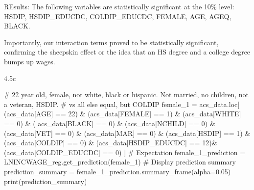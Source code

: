 \documentclass[
  11pt,
  letterpaper,
  DIV=11,
  numbers=noendperiod]{scrartcl}
\newenvironment{Shaded}{\begin{snugshade}}{\end{snugshade}}
\newcommand{\BuiltInTok}[1]{\textcolor[rgb]{0.00,0.23,0.31}{#1}}
\newcommand{\CommentTok}[1]{\textcolor[rgb]{0.37,0.37,0.37}{#1}}
\newcommand{\DecValTok}[1]{\textcolor[rgb]{0.68,0.00,0.00}{#1}}
\newcommand{\FloatTok}[1]{\textcolor[rgb]{0.68,0.00,0.00}{#1}}
\newcommand{\NormalTok}[1]{\textcolor[rgb]{0.00,0.23,0.31}{#1}}
\newcommand{\OperatorTok}[1]{\textcolor[rgb]{0.37,0.37,0.37}{#1}}
\newcommand{\StringTok}[1]{\textcolor[rgb]{0.13,0.47,0.30}{#1}}
\begin{document}
REsults: The following variables are statistically significant at the
10\% level: HSDIP, HSDIP\_EDUCDC, COLDIP\_EDUCDC, FEMALE, AGE, AGEQ,
BLACK.

Importantly, our interaction terms proved to be statistically
significant, confirming the sheepskin effect or the idea that an HS
degree and a college degree bumps up wages.

4.5c

\begin{Shaded}
\begin{Highlighting}[]
\CommentTok{\# 22 year old, female, not white, black or hispanic. Not married, no children, not a veteran, HSDIP.}
\CommentTok{\# vs all else equal, but COLDIP}
\NormalTok{female\_1 }\OperatorTok{=}\NormalTok{ acs\_data.loc[}
\NormalTok{    (acs\_data[}\StringTok{\textquotesingle{}AGE\textquotesingle{}}\NormalTok{] }\OperatorTok{==} \DecValTok{22}\NormalTok{) }\OperatorTok{\&}\NormalTok{ (acs\_data[}\StringTok{\textquotesingle{}FEMALE\textquotesingle{}}\NormalTok{] }\OperatorTok{==} \DecValTok{1}\NormalTok{) }\OperatorTok{\&}\NormalTok{ (acs\_data[}\StringTok{\textquotesingle{}WHITE\textquotesingle{}}\NormalTok{] }\OperatorTok{==} \DecValTok{0}\NormalTok{) }\OperatorTok{\&}\NormalTok{ (}
\NormalTok{        acs\_data[}\StringTok{\textquotesingle{}BLACK\textquotesingle{}}\NormalTok{] }\OperatorTok{==} \DecValTok{0}\NormalTok{) }\OperatorTok{\&}\NormalTok{ (acs\_data[}\StringTok{\textquotesingle{}NCHILD\textquotesingle{}}\NormalTok{] }\OperatorTok{==} \DecValTok{0}\NormalTok{) }\OperatorTok{\&}\NormalTok{ (acs\_data[}\StringTok{\textquotesingle{}VET\textquotesingle{}}\NormalTok{] }\OperatorTok{==} \DecValTok{0}\NormalTok{) }\OperatorTok{\&}\NormalTok{ (acs\_data[}\StringTok{\textquotesingle{}MAR\textquotesingle{}}\NormalTok{] }\OperatorTok{==} \DecValTok{0}\NormalTok{) }\OperatorTok{\&}\NormalTok{ (acs\_data[}\StringTok{\textquotesingle{}HSDIP\textquotesingle{}}\NormalTok{] }\OperatorTok{==} \DecValTok{1}\NormalTok{) }\OperatorTok{\&}\NormalTok{ (acs\_data[}\StringTok{\textquotesingle{}COLDIP\textquotesingle{}}\NormalTok{] }\OperatorTok{==} \DecValTok{0}\NormalTok{) }\OperatorTok{\&}\NormalTok{ (acs\_data[}\StringTok{\textquotesingle{}HSDIP\_EDUCDC\textquotesingle{}}\NormalTok{] }\OperatorTok{==} \DecValTok{12}\NormalTok{)}\OperatorTok{\&}\NormalTok{ (acs\_data[}\StringTok{\textquotesingle{}COLDIP\_EDUCDC\textquotesingle{}}\NormalTok{] }\OperatorTok{==} \DecValTok{0}\NormalTok{)}
\NormalTok{]}
\CommentTok{\# Expectation }
\NormalTok{female\_1\_prediction }\OperatorTok{=}\NormalTok{ LNINCWAGE\_reg.get\_prediction(female\_1)}
\CommentTok{\# Display prediction summary}
\NormalTok{prediction\_summary }\OperatorTok{=}\NormalTok{ female\_1\_prediction.summary\_frame(alpha}\OperatorTok{=}\FloatTok{0.05}\NormalTok{)}
\BuiltInTok{print}\NormalTok{(prediction\_summary)}


\end{Highlighting}
\end{Shaded}
\end{document}
